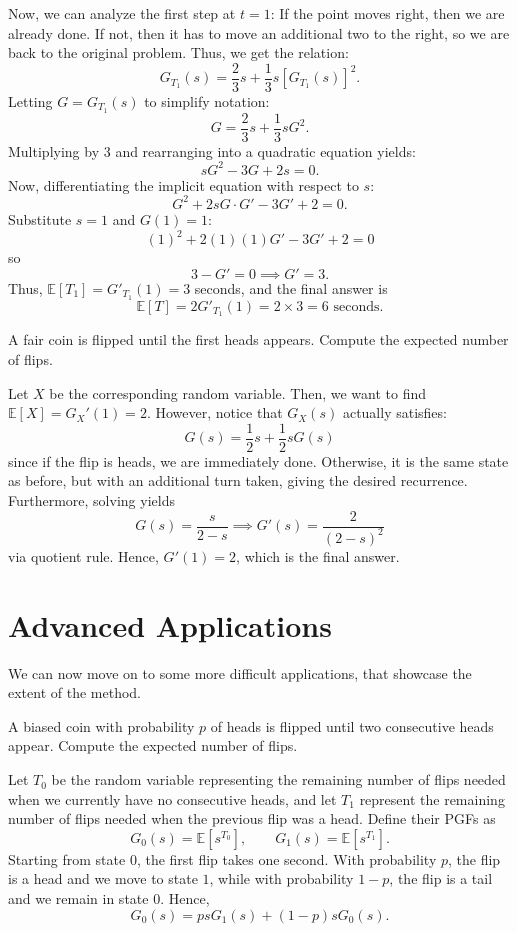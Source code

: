 \documentclass[11pt]{scrartcl}
\begin{document}
Now, we can analyze the first step at $t = 1$: If the point moves right, then we are already done. If not, then it has to move an additional two to the right, so we are back to the original problem. Thus, we get the relation: \[G_{T_1}(s) = \frac{2}{3}s + \frac{1}{3}s [G_{T_1}(s)]^2.\] Letting $G = G_{T_1}(s)$ to simplify notation: \[G = \frac{2}{3}s + \frac{1}{3}sG^2.\] Multiplying by $3$ and rearranging into a quadratic equation yields: \[sG^2 - 3G + 2s = 0.\] Now, differentiating the implicit equation with respect to $s$: \[G^2 + 2sG \cdot G' - 3G' + 2 = 0.\] Substitute $s = 1$ and $G(1) = 1$: \[(1)^2 + 2(1)(1)G' - 3G' + 2 = 0\] so \[3-G' = 0 \implies G' = 3.\] Thus, $\mathbb{E}[T_1] = G'_{T_1}(1) = 3$ seconds, and the final answer is \[\mathbb{E}[T] = 2G'_{T_1}(1) = 2 \times 3 = \boxed{6 \text{ seconds}}.\]

\begin{example*}
A fair coin is flipped until the first heads appears. Compute the expected number of flips.
\end{example*}

Let $X$ be the corresponding random variable. Then, we want to find $\mathbb{E}[X] = G_X'(1) = 2$. However, notice that $G_X(s)$ actually satisfies: \[G(s) = \dfrac{1}{2}s+\dfrac{1}{2}sG(s)\] since if the flip is heads, we are immediately done. Otherwise, it is the same state as before, but with an additional turn taken, giving the desired recurrence. Furthermore, solving yields \[G(s) = \dfrac{s}{2-s} \implies G'(s) = \dfrac{2}{(2-s)^2}\] via quotient rule. Hence, $G'(1) = \boxed{2}$, which is the final answer.

\section{Advanced Applications}

We can now move on to some more difficult applications, that showcase the extent of the method.

\begin{example*}
A biased coin with probability $p$ of heads is flipped until two consecutive heads appear. Compute the expected number of flips.
\end{example*}

Let $T_0$ be the random variable representing the remaining number of flips needed when we currently have no consecutive heads, and let $T_1$ represent the remaining number of flips needed when the previous flip was a head. Define their PGFs as \[G_0(s)=\mathbb{E}[s^{T_0}], \qquad G_1(s)=\mathbb{E}[s^{T_1}].\] Starting from state $0$, the first flip takes one second. With probability $p$, the flip is a head and we move to state $1$, while with probability $1-p$, the flip is a tail and we remain in state $0$. Hence, \[G_0(s)=psG_1(s)+(1-p)sG_0(s).\]
\end{document}
